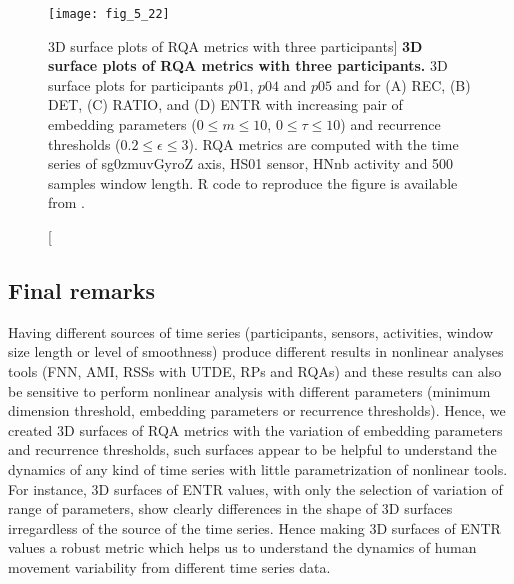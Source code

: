 \begin{figure}
\centering
\texttt{[image: fig\_5\_22]}
    \caption
	[3D surface plots of RQA metrics with three participants]{
	{\bf 3D surface plots of RQA metrics with three participants.}
	3D surface plots for participants $p01$, $p04$ and $p05$ 
	and for (A) REC, (B) DET, (C) RATIO, and (D) ENTR 
	with increasing pair of embedding parameters 
	($0 \le m \le 10$, $0 \le \tau \le 10$) 
	and recurrence thresholds ($ 0.2 \le \epsilon \le 3 $).
	RQA metrics are computed with the time series of
	sg0zmuvGyroZ axis, HS01 sensor, HNnb activity and 500 
	samples window length.
	R code to reproduce the figure is available from \cite{xochicale2018}.
 }
\label{fig:topo_participants_hii}
\end{figure}

\subsection{Final remarks}
Having different sources of time series (participants, sensors, 
activities, window size length or level of smoothness) produce different
results in nonlinear analyses tools (FNN, AMI, RSSs with UTDE, RPs and
RQAs) and these results can also be sensitive to perform nonlinear analysis 
with different parameters (minimum dimension threshold, 
embedding parameters or recurrence thresholds).
Hence, we created 3D surfaces of RQA metrics with the 
variation of embedding parameters and recurrence thresholds,
such surfaces appear to be helpful to understand the dynamics 
of any kind of time series with little parametrization of nonlinear tools.
For instance, 
3D surfaces of ENTR values, with only the selection of variation of range 
of parameters, show clearly differences in the shape of 3D surfaces 
irregardless of the source of the time series. Hence making 3D surfaces 
of ENTR values a robust metric which helps us to understand the dynamics 
of human movement variability from different time series data.

